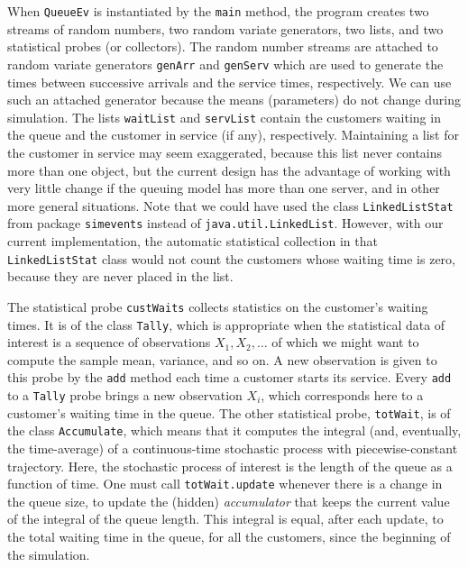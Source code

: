 When \texttt{QueueEv} is instantiated  by the \texttt{main} method,
the program creates
two streams of random numbers,
two random variate generators, two
lists, and two statistical probes (or collectors).
The random number streams
are attached to random variate generators
\texttt{genArr} and \texttt{genServ} which are used to generate the times
between successive arrivals and the service times, respectively.
We can use such an attached generator because the means (parameters)
do not change during simulation.
The lists \texttt{waitList} and \texttt{servList} contain the customers
waiting in the queue and the customer in service (if any), respectively.
Maintaining a list for the customer in service may seem exaggerated,
because this list never contains more than one object, but the current
design has the advantage of working with very little change if the
queuing model has more than one server, and in other more general
situations.
Note that we could have used the class \texttt{LinkedListStat} from package
\texttt{simevents} instead of \texttt{java.util.LinkedList}.
However, with our current implementation,
the automatic statistical collection in that \texttt{LinkedListStat}
class would not count the customers whose waiting time is zero, because
they are never placed in the list.
\begin{comment}
Here we use the class \texttt{List} from package \texttt{simevents}.
This class is equivalent to the standard class \texttt{java.util.LinkedList},
except that its implementation is more efficient than the current one
in JDK and it can also collect statistics automatically.
However, the automatic statistical collection on \texttt{waitList}
would not count the customers whose waiting time is zero, because
they are never placed in this list, so we do not use this facility.
\end{comment}

The statistical probe \texttt{custWaits} collects statistics on the
customer's waiting times.  It is of the class \texttt{Tally}, which
is appropriate when the statistical data of interest is  a sequence
of observations $X_1, X_2, \dots$ of which we might want to compute
the sample mean, variance, and so on.
A new observation is given to this probe by the \texttt{add} method
each time a customer starts its service.
Every \texttt{add} to a \texttt{Tally} probe brings a new observation $X_i$,
which corresponds here to a customer's waiting time in the queue.
The other statistical probe, \texttt{totWait}, is of the class
\texttt{Accumulate}, which means that it computes the integral
(and, eventually, the time-average) of a continuous-time
stochastic process with piecewise-constant trajectory.
Here, the stochastic process of interest is the length of the queue
as a function of time.  One must call \texttt{totWait.update} whenever
there is a change in the queue size, to update the (hidden)
{\em accumulator\/} that keeps the current value of the integral
of the queue length.  This integral is equal, after each update,
to the total waiting time in the queue, for all the customers,
since the beginning of the simulation.

